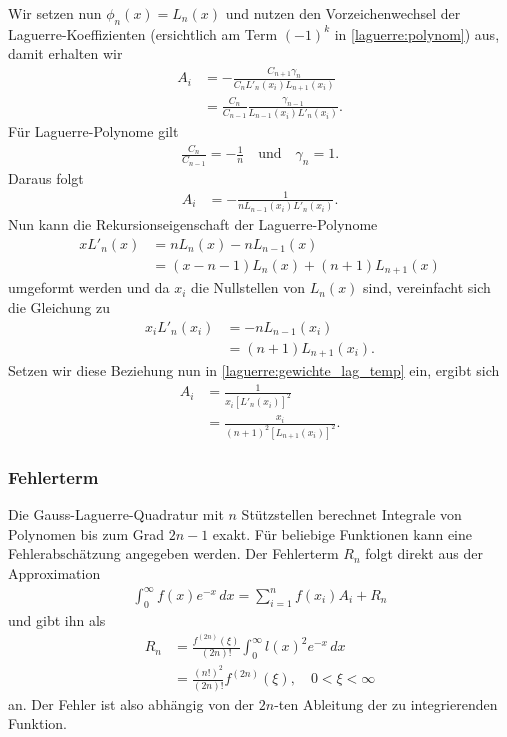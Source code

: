 Wir setzen nun $\phi_n(x) = L_n(x)$ und
nutzen den Vorzeichenwechsel der Laguerre-Koeffizienten
(ersichtlich am Term $(-1)^k$ in \eqref{laguerre:polynom})
aus,
damit erhalten wir
\begin{align*}
A_i
 & =
-\frac{C_{n+1} \gamma_n}{C_n L'_n(x_i) L_{n+1} (x_i)}
\\
 & = \frac{C_n}{C_{n-1}} \frac{\gamma_{n-1}}{L_{n-1}(x_i) L'_n(x_i)}
.
\end{align*}
Für Laguerre-Polynome gilt
\begin{align*}
\frac{C_n}{C_{n-1}}
=
-\frac{1}{n}
\quad \text{und} \quad
\gamma_n
=
1
.
\end{align*}
Daraus folgt
\begin{align}
A_i
 & =
- \frac{1}{n L_{n-1}(x_i) L'_n(x_i)}
\label{laguerre:gewichte_lag_temp}
.
\end{align}
Nun kann die Rekursionseigenschaft der Laguerre-Polynome
\cite{laguerre:hildebrand2013introduction}
\begin{align*}
x L'_n(x)
 & =
n L_n(x) - n L_{n-1}(x)
\\
 & = (x - n - 1) L_n(x) + (n + 1) L_{n+1}(x)
\end{align*}
umgeformt werden und da $x_i$ die Nullstellen von $L_n(x)$ sind,
vereinfacht sich die Gleichung zu
\begin{align*}
x_i L'_n(x_i)
 & =
- n L_{n-1}(x_i)
\\
 & =
(n + 1) L_{n+1}(x_i)
.
\end{align*}
Setzen wir diese Beziehung nun in \eqref{laguerre:gewichte_lag_temp} ein,
ergibt sich
\begin{align}
\nonumber
A_i
 & =
\frac{1}{x_i \left[ L'_n(x_i) \right]^2}
\\
 & =
\frac{x_i}{(n+1)^2 \left[ L_{n+1}(x_i) \right]^2}
.
\label{laguerre:quadratur_gewichte}
\end{align}

\subsubsection{Fehlerterm}
Die Gauss-Laguerre-Quadratur mit $n$ Stützstellen berechnet Integrale
von Polynomen bis zum Grad $2n - 1$ exakt.
Für beliebige Funktionen kann eine Fehlerabschätzung angegeben werden.
Der Fehlerterm $R_n$ folgt direkt aus der Approximation
\begin{align*}
\int_0^{\infty} f(x) e^{-x} \, dx
=
\sum_{i=1}^n f(x_i) A_i + R_n
\end{align*}
und \cite{laguerre:abramowitz+stegun} gibt ihn als
\begin{align}
R_n
 & =
\frac{f^{(2n)}(\xi)}{(2n)!} \int_0^\infty l(x)^2 e^{-x}\,dx
\\
 & =
\frac{(n!)^2}{(2n)!} f^{(2n)}(\xi)
,\quad
0 < \xi < \infty
\label{laguerre:lag_error}
\end{align}
an.
Der Fehler ist also abhängig von der $2n$-ten Ableitung
der zu integrierenden Funktion.
